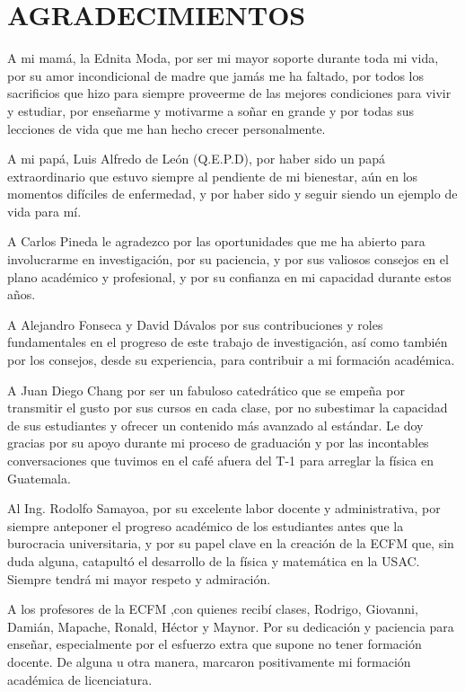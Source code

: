 \chapter*{AGRADECIMIENTOS}
\thispagestyle{empty}
A mi mamá, la Ednita Moda, por ser mi mayor soporte durante toda mi vida,
por su amor incondicional de madre que jamás me ha faltado,
por todos los sacrificios que hizo para siempre proveerme de 
las mejores condiciones para vivir y estudiar, por enseñarme y motivarme
a soñar en grande y por todas sus lecciones de vida que me han hecho
crecer personalmente.

A mi papá, Luis Alfredo de León (Q.E.P.D), por haber sido un papá extraordinario que 
estuvo siempre al pendiente de mi bienestar, aún en los momentos difíciles 
de enfermedad, y por haber sido y seguir siendo un ejemplo de vida para mí. 

A Carlos Pineda le agradezco por las oportunidades que me ha abierto para 
involucrarme en investigación, por su paciencia, y por sus valiosos consejos 
en el plano académico y profesional, y por su confianza en mi capacidad 
durante estos años.

A Alejandro Fonseca y David Dávalos por sus contribuciones y roles fundamentales
en el progreso de este trabajo de investigación, así como también por
los consejos, desde su experiencia, para contribuir a mi formación académica.

A Juan Diego Chang por ser un fabuloso catedrático que se empeña por transmitir
el gusto por sus cursos en cada clase, por no subestimar la capacidad de sus 
estudiantes y ofrecer un contenido más avanzado al estándar. 
Le doy gracias por su apoyo durante mi proceso de graduación
y por las incontables conversaciones que tuvimos en el café afuera del T-1
para arreglar la física en Guatemala.

Al Ing. Rodolfo Samayoa, por su excelente labor docente y administrativa, 
por siempre anteponer el progreso académico de los estudiantes antes que 
la burocracia universitaria, y por su papel clave en la creación de la ECFM
que, sin duda alguna, catapultó el desarrollo de la física y matemática en la USAC.
Siempre tendrá mi mayor respeto y admiración.

A los profesores de la ECFM ,con quienes recibí clases,
Rodrigo, Giovanni, Damián, Mapache, Ronald, Héctor y Maynor.
Por su dedicación y paciencia para enseñar, especialmente por 
el esfuerzo extra que supone no tener formación docente. 
De alguna u otra manera, marcaron positivamente mi formación 
académica de licenciatura. 


